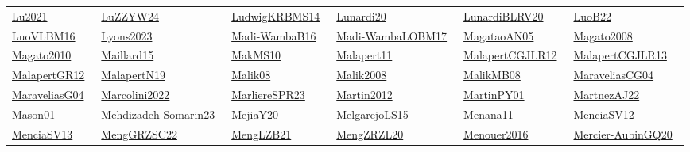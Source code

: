 \begin{longtable}{*{6}{l}}
\href{../works/Lu2021.pdf}{Lu2021}~\cite{Lu2021} & \href{../works/LuZZYW24.pdf}{LuZZYW24}~\cite{LuZZYW24} & \href{../works/LudwigKRBMS14.pdf}{LudwigKRBMS14}~\cite{LudwigKRBMS14} & \href{../works/Lunardi20.pdf}{Lunardi20}~\cite{Lunardi20} & \href{../works/LunardiBLRV20.pdf}{LunardiBLRV20}~\cite{LunardiBLRV20} & \href{../works/LuoB22.pdf}{LuoB22}~\cite{LuoB22}\\ 
\href{../works/LuoVLBM16.pdf}{LuoVLBM16}~\cite{LuoVLBM16} & \href{../works/Lyons2023.pdf}{Lyons2023}~\cite{Lyons2023} & \href{../works/Madi-WambaB16.pdf}{Madi-WambaB16}~\cite{Madi-WambaB16} & \href{../works/Madi-WambaLOBM17.pdf}{Madi-WambaLOBM17}~\cite{Madi-WambaLOBM17} & \href{../}{MagataoAN05}~\cite{MagataoAN05} & \href{../works/Magato2008.pdf}{Magato2008}~\cite{Magato2008}\\ 
\href{../works/Magato2010.pdf}{Magato2010}~\cite{Magato2010} & \href{../works/Maillard15.pdf}{Maillard15}~\cite{Maillard15} & \href{../works/MakMS10.pdf}{MakMS10}~\cite{MakMS10} & \href{../works/Malapert11.pdf}{Malapert11}~\cite{Malapert11} & \href{../works/MalapertCGJLR12.pdf}{MalapertCGJLR12}~\cite{MalapertCGJLR12} & \href{../works/MalapertCGJLR13.pdf}{MalapertCGJLR13}~\cite{MalapertCGJLR13}\\ 
\href{../works/MalapertGR12.pdf}{MalapertGR12}~\cite{MalapertGR12} & \href{../works/MalapertN19.pdf}{MalapertN19}~\cite{MalapertN19} & \href{../works/Malik08.pdf}{Malik08}~\cite{Malik08} & \href{../works/Malik2008.pdf}{Malik2008}~\cite{Malik2008} & \href{../works/MalikMB08.pdf}{MalikMB08}~\cite{MalikMB08} & \href{../works/MaraveliasCG04.pdf}{MaraveliasCG04}~\cite{MaraveliasCG04}\\ 
\href{../works/MaraveliasG04.pdf}{MaraveliasG04}~\cite{MaraveliasG04} & \href{../}{Marcolini2022}~\cite{Marcolini2022} & \href{../works/MarliereSPR23.pdf}{MarliereSPR23}~\cite{MarliereSPR23} & \href{../works/Martin2012.pdf}{Martin2012}~\cite{Martin2012} & \href{../works/MartinPY01.pdf}{MartinPY01}~\cite{MartinPY01} & \href{../}{MartnezAJ22}~\cite{MartnezAJ22}\\ 
\href{../works/Mason01.pdf}{Mason01}~\cite{Mason01} & \href{../works/Mehdizadeh-Somarin23.pdf}{Mehdizadeh-Somarin23}~\cite{Mehdizadeh-Somarin23} & \href{../works/MejiaY20.pdf}{MejiaY20}~\cite{MejiaY20} & \href{../works/MelgarejoLS15.pdf}{MelgarejoLS15}~\cite{MelgarejoLS15} & \href{../works/Menana11.pdf}{Menana11}~\cite{Menana11} & \href{../works/MenciaSV12.pdf}{MenciaSV12}~\cite{MenciaSV12}\\ 
\href{../works/MenciaSV13.pdf}{MenciaSV13}~\cite{MenciaSV13} & \href{../works/MengGRZSC22.pdf}{MengGRZSC22}~\cite{MengGRZSC22} & \href{../works/MengLZB21.pdf}{MengLZB21}~\cite{MengLZB21} & \href{../works/MengZRZL20.pdf}{MengZRZL20}~\cite{MengZRZL20} & \href{../works/Menouer2016.pdf}{Menouer2016}~\cite{Menouer2016} & \href{../works/Mercier-AubinGQ20.pdf}{Mercier-AubinGQ20}~\cite{Mercier-AubinGQ20}\\ 

\end{longtable}
